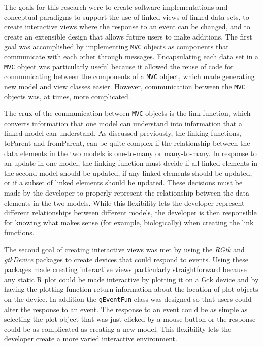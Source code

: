 \documentclass[11pt]{article}
\newcommand{\Rfunction}[1]{{\textsf{#1}}}
\newcommand{\Robject}[1]{{\texttt{#1}}}
\newcommand{\Rpackage}[1]{{\textit{#1}}}
\newcommand{\Rclass}[1]{\texttt{#1}}
\begin{document}
The goals for this research were to create software implementations and
conceptual paradigms to support the use of linked views of linked data sets,
to create interactive views where the response to an event can be changed, and
to create an extensible design that allows future users to make additions.
The first goal was accomplished by implementing \Robject{MVC} objects as
components that communicate with each other through messages.  Encapsulating
each data set in a \Robject{MVC} object was particularly useful because it
allowed the reuse of code for communicating between the components of a
\Robject{MVC} object, which made generating new model and view classes easier.
However, communication between the \Robject{MVC} objects was, at times, more
complicated. 

The crux of the communication between \Robject{MVC} objects is the link
function, which converts information that one model can understand into
information that a linked model can understand.  As discussed previously, the
linking functions, \Rfunction{toParent} and \Rfunction{fromParent}, can be
quite complex if the relationship between the data elements in the two models
is one-to-many or many-to-many.  In response to an update in one model, the
linking function must decide if all linked elements in the second model
should be updated, if any linked elements should be updated, or if a subset of
linked elements should be updated.  These decisions must be made by the
developer to properly represent the relationship between the data elements in
the two models.  While this flexibility lets the developer represent different
relationships between different models, the developer is then responsible for
knowing what makes sense (for example, biologically) when creating the link
functions. 

The second goal of creating interactive views was met by using the
\Rpackage{RGtk} and \Rpackage{gtkDevice} packages \cite{RGtk} to create
devices that could respond to events.  Using these packages made creating
interactive views particularly straightforward because any static R plot could
be made interactive by plotting it on a Gtk device and by having the plotting
function return information about the location of plot objects on the device.
In addition the \Rclass{gEventFun} class was designed so that users could alter
the response to an event.  The response to an event could be as simple as
selecting the plot object that was just clicked by a mouse button or the
response could be as complicated as creating a new model.  This flexibility
lets the developer create a more varied interactive environment.
\end{document}
